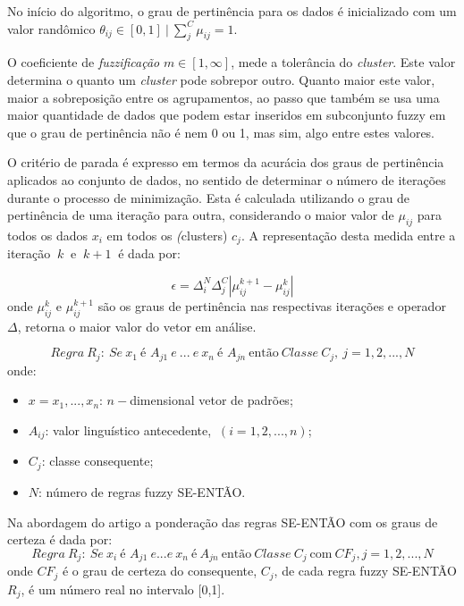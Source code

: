 \documentclass[12pt,a4paper]{article}
\numberwithin{equation}{section}
\begin{document}
No início do algoritmo, o grau de pertinência para os dados é inicializado com um valor randômico $\theta_{ij}\in{[0,1]} ~|~\sum_{j}^{C}\mu_{ij}=1$.

O coeficiente de \textit{fuzzificação} $m \in [1,\infty]$, mede a tolerância do \textit{cluster}. Este valor determina o quanto um \textit{cluster} pode sobrepor outro. Quanto maior este valor, maior a sobreposição entre os agrupamentos, ao passo que também se usa uma maior quantidade de dados que podem estar inseridos em subconjunto fuzzy em que o grau de pertinência não é nem 0 ou 1, mas sim, algo entre estes valores.

O critério de parada é expresso em termos da acurácia dos graus de pertinência aplicados ao conjunto de dados, no sentido de determinar o número de iterações durante o processo de minimização. Esta é calculada utilizando o grau de pertinência de uma iteração para outra, considerando o maior valor de $\mu_{ij}$ para todos os dados $x_{i}$ em todos os \textit(clusters) $c_{j}$. A representação desta medida entre a iteração $~k~$ e $~k+1~$ é dada por:

\begin{equation}
\epsilon=\Delta_{i}^{N}\Delta_{j}^{C}|\mu_{ij}^{k+1} - \mu_{ij}^{k}| 
\end{equation}
onde $\mu_{ij}^{k}$ e $\mu_{ij}^{k+1}$ são os graus de pertinência nas respectivas iterações e operador $\Delta$, retorna o maior valor do vetor em análise.


\begin{equation} \label{eq:eq1}
Regra~R_{j}:~Se~x_{1}~ \text{é }A_{j1}~e~...~e~x_{n}~\text{é }A_{jn}~\text{então}~Classe~C_{j},~j=1,2,...,N
\end{equation}
onde:
\begin{itemize}
\item $x={x_{1},...,x_{n}}$: $n-$dimensional vetor de padrões;
\item $A_{ij}$: valor linguístico antecedente, $~(i=1,2,...,n)$;
\item $C_{j}$: classe consequente;
\item $N$: número de regras fuzzy SE-ENTÃO.
\end{itemize}

Na abordagem do artigo a ponderação das regras SE-ENTÃO com os graus de certeza é dada por:
\begin{equation} \label{eq:eq2}
Regra~R_{j}:~Se~x_{i}~\text{é } A_{j1}~e...e~x_{n}~\text{é}~A_{jn}~\text{então}~Classe~C_{j}~\text{com}~CF_{j}, j=1,2,...,N
\end{equation}
onde $CF_{j}$ é o grau de certeza do consequente, $C_{j}$, de cada regra fuzzy SE-ENTÃO $R_{j}$, é um número real no intervalo [0,1].
\end{document}
